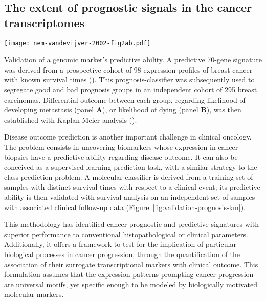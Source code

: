 \subsection{The extent of prognostic signals in the cancer transcriptomes}
\label{sec:discussion-prognostic-microarrays}

\begin{marginfigure}%
  \texttt{[image: nem-vandevijver-2002-fig2ab.pdf]}
  \caption[Validation of a genomic marker's predictive ability]{Validation of a
    genomic marker's predictive ability.  A predictive 70-gene signature was
    derived from a prospective cohort of 98 expression profiles of breast cancer
    with known survival times (\citealp{vant_veer_gene_2002}).  This
    prognosis-classifier was subsequently used to segregate good and bad
    prognosis groups in an independent cohort of 295 breast
    carcinomas. Differential outcome between each group, regarding likelihood of
    developing metastasis (panel \textbf{A}), or likelihood of dying (panel
    \textbf{B}), was then established with Kaplan-Meier analysis
    (\citealp{van_de_vijver_gene-expression_2002}).}
  \label{fig:validation-prognosis-km}%
\end{marginfigure}

Disease outcome prediction is another important challenge in clinical
oncology.\cite{van_de_vijver_gene-expression_2002,vasselli_predicting_2003,sanchez-carbayo_defining_2006}
The problem consists in uncovering biomarkers whose expression in cancer
biopsies have a predictive ability regarding disease outcome.  It can also be
conceived as a supervised learning prediction task, with a similar strategy to
the class prediction problem.  A molecular classifier is derived from a training
set of samples with distinct survival times with respect to a clinical event;
its predictive ability is then validated with survival analysis on an
independent set of samples with associated clinical follow-up data
(Figure~\ref{fig:validation-prognosis-km}).

This methodology has identified cancer prognostic and predictive signatures with
superior performance to conventional histopathological or clinical
parameters.\cite{sole_biological_2009} Additionally, it offers a framework to
test for the implication of particular biological processes in cancer
progression, through the quantification of the association of their surrogate
transcriptional markers with clinical outcome.\cite{chang_gene_2004} This
formulation assumes that the expression patterns prompting cancer progression
are universal motifs, yet specific enough to be modeled by biologically
motivated molecular markers.


